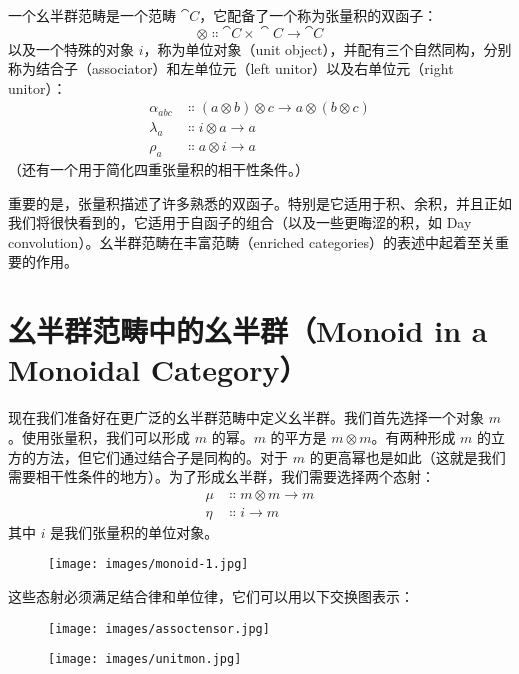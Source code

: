 一个幺半群范畴是一个范畴 $\cat{C}$，它配备了一个称为张量积的双函子：
\[\otimes \Colon \cat{C}\times{}\cat{C} \to \cat{C}\]
以及一个特殊的对象 $i$，称为单位对象（unit object），并配有三个自然同构，分别称为结合子（associator）和左单位元（left unitor）以及右单位元（right unitor）：
\begin{align*}
  \alpha_{a b c} & \Colon (a \otimes b) \otimes c \to a \otimes (b \otimes c) \\
  \lambda_a      & \Colon i \otimes a \to a                                   \\
  \rho_a         & \Colon a \otimes i \to a
\end{align*}
（还有一个用于简化四重张量积的相干性条件。）

重要的是，张量积描述了许多熟悉的双函子。特别是它适用于积、余积，并且正如我们将很快看到的，它适用于自函子的组合（以及一些更晦涩的积，如 Day convolution）。幺半群范畴在丰富范畴（enriched categories）的表述中起着至关重要的作用。

\section{幺半群范畴中的幺半群（Monoid in a Monoidal Category）}

现在我们准备好在更广泛的幺半群范畴中定义幺半群。我们首先选择一个对象 $m$。使用张量积，我们可以形成 $m$ 的幂。$m$ 的平方是 $m \otimes m$。有两种形成 $m$ 的立方的方法，但它们通过结合子是同构的。对于 $m$ 的更高幂也是如此（这就是我们需要相干性条件的地方）。为了形成幺半群，我们需要选择两个态射：
\begin{align*}
  \mu  & \Colon m \otimes m \to m \\
  \eta & \Colon i \to m
\end{align*}
其中 $i$ 是我们张量积的单位对象。

\begin{figure}[H]
  \centering
  \texttt{[image: images/monoid-1.jpg]}
\end{figure}

\noindent
这些态射必须满足结合律和单位律，它们可以用以下交换图表示：

\begin{figure}[H]
  \centering
  \texttt{[image: images/assoctensor.jpg]}
\end{figure}

\begin{figure}[H]
  \centering
  \texttt{[image: images/unitmon.jpg]}
\end{figure}


